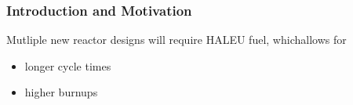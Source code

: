 \begin{frame}
    \frametitle{Introduction and Motivation}
    Mutliple new reactor designs will require \gls{HALEU} fuel, whichallows for 
    \begin{itemize}
        \item longer cycle times
        \item higher burnups 
    \end{itemize}

\end{frame}